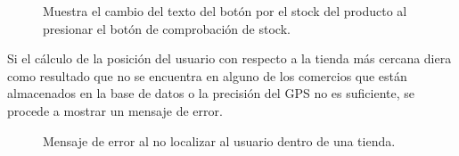 \begin{figure}[H]
	\centering
	\caption{Muestra el cambio del texto del botón por el stock del producto al presionar el botón de comprobación de stock.}
	\label{fig:botonStock}
\end{figure}

Si el cálculo de la posición del usuario con respecto a la tienda más cercana diera como resultado que no se encuentra en alguno de los comercios que están almacenados en la base de datos o la precisión del GPS no es suficiente, se procede a mostrar un mensaje de error.

\begin{figure}[H]
	\centering
	\caption{Mensaje de error al no localizar al usuario dentro de una tienda.}
	\label{fig:errorGPS}
\end{figure}

